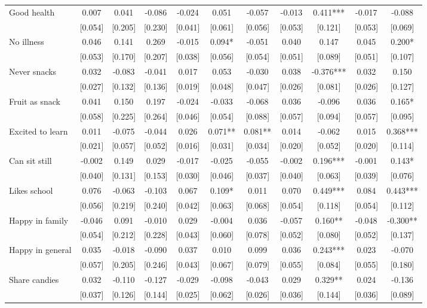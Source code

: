 \documentclass[12pt]{article}
\begin{document}
\begin{table}[ht]
\begin{center}
\begin{adjustbox}{width=1.2\textwidth,center=\textwidth}
\begin{tabular}{l*{10}{c}}
Good health & 0.007 & 0.041 & -0.086 & -0.024 & 0.051 & -0.057 & -0.013 & 0.411*** & -0.017 & -0.088 \\
 & [0.054] & [0.205] & [0.230] & [0.041] & [0.061] & [0.056] & [0.053] & [0.121] & [0.053] & [0.069] \\
No illness & 0.046 & 0.141 & 0.269 & -0.015 & 0.094* & -0.051 & 0.040 & 0.147 & 0.045 & 0.200* \\
 & [0.053] & [0.170] & [0.207] & [0.038] & [0.056] & [0.054] & [0.051] & [0.089] & [0.051] & [0.107] \\
Never snacks & 0.032 & -0.083 & -0.041 & 0.017 & 0.053 & -0.030 & 0.038 & -0.376*** & 0.032 & 0.150 \\
 & [0.027] & [0.132] & [0.136] & [0.019] & [0.048] & [0.047] & [0.026] & [0.081] & [0.026] & [0.127] \\
Fruit as snack & 0.041 & 0.150 & 0.197 & -0.024 & -0.033 & -0.068 & 0.036 & -0.096 & 0.036 & 0.165* \\
 & [0.058] & [0.225] & [0.264] & [0.046] & [0.054] & [0.088] & [0.057] & [0.094] & [0.057] & [0.095] \\
Excited to learn & 0.011 & -0.075 & -0.044 & 0.026 & 0.071** & 0.081** & 0.014 & -0.062 & 0.015 & 0.368*** \\
 & [0.021] & [0.057] & [0.052] & [0.016] & [0.031] & [0.034] & [0.020] & [0.052] & [0.020] & [0.114] \\
Can sit still & -0.002 & 0.149 & 0.029 & -0.017 & -0.025 & -0.055 & -0.002 & 0.196*** & -0.001 & 0.143* \\
 & [0.040] & [0.131] & [0.153] & [0.030] & [0.046] & [0.037] & [0.040] & [0.063] & [0.039] & [0.076] \\
Likes school & 0.076 & -0.063 & -0.103 & 0.067 & 0.109* & 0.011 & 0.070 & 0.449*** & 0.084 & 0.443*** \\
 & [0.056] & [0.219] & [0.240] & [0.042] & [0.063] & [0.068] & [0.054] & [0.118] & [0.054] & [0.112] \\
Happy in family & -0.046 & 0.091 & -0.010 & 0.029 & -0.004 & 0.036 & -0.057 & 0.160** & -0.048 & -0.300** \\
 & [0.054] & [0.212] & [0.228] & [0.043] & [0.060] & [0.078] & [0.052] & [0.080] & [0.052] & [0.137] \\
Happy in general & 0.035 & -0.018 & -0.090 & 0.037 & 0.010 & 0.099 & 0.036 & 0.243*** & 0.023 & -0.070 \\
 & [0.057] & [0.205] & [0.246] & [0.043] & [0.067] & [0.079] & [0.055] & [0.084] & [0.055] & [0.180] \\
Share candies & 0.032 & -0.110 & -0.127 & -0.029 & -0.098 & -0.043 & 0.029 & 0.329** & 0.024 & -0.136 \\
 & [0.037] & [0.126] & [0.144] & [0.025] & [0.062] & [0.026] & [0.036] & [0.144] & [0.036] & [0.089] \\


\end{tabular}
\end{adjustbox}
\end{center}
\end{table}
\end{document}
